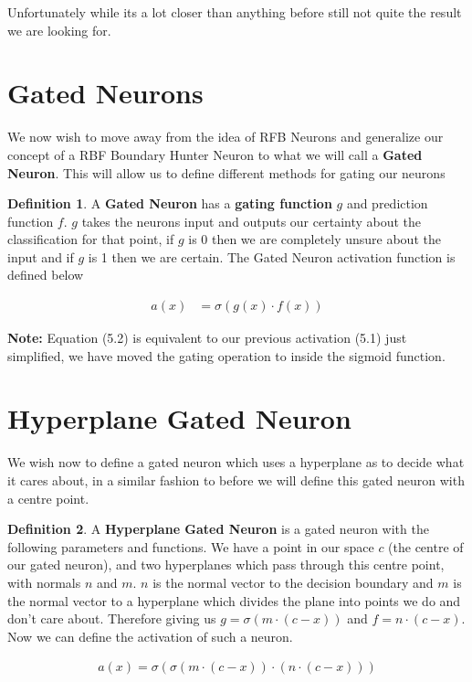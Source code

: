 \documentclass[notitlepage]{report}
\theoremstyle{definition}
\newtheorem{definition}{Definition}[section]
\begin{document}
Unfortunately while its a lot closer than anything before still not quite the result we are looking for.

\section{Gated Neurons}
We now wish to move away from the idea of RFB Neurons and generalize our concept of a RBF Boundary Hunter Neuron to what we will call a \textbf{Gated Neuron}. This will allow us to define different methods for gating our neurons

\theoremstyle{definition}
\begin{definition}
A \textbf{Gated Neuron} has a \textbf{gating function} $g$ and prediction function $f$. $g$ takes the neurons input and outputs our certainty about the classification for that point, if $g$ is 0 then we are completely unsure about the input and if $g$ is 1 then we are certain. The Gated Neuron activation function is defined below

\begin{align}
a(x) &= \sigma(g(x) \cdot f(x))
\end{align}

\textbf{Note: } Equation (5.2) is equivalent to our previous activation (5.1) just simplified, we have moved the gating operation to inside the sigmoid function.

\end{definition}

\section{Hyperplane Gated Neuron}
We wish now to define a gated neuron which uses a hyperplane as to decide what it cares about, in a similar fashion to before we will define this gated neuron with a centre point.

\theoremstyle{definition}
\begin{definition}
A \textbf{Hyperplane Gated Neuron} is a gated neuron with the following parameters and functions. We have a point in our space $c$ (the centre of our gated neuron), and two hyperplanes which pass through this centre point, with normals $n$ and $m$. $n$ is the normal vector to the decision boundary and $m$ is the normal vector to a hyperplane which divides the plane into points we do and don't care about. Therefore giving us $g = \sigma(m \cdot (c - x))$ and $f = n \cdot (c - x)$. Now we can define the activation of such a neuron.

\begin{align}
a(x) = \sigma(\sigma(m \cdot (c - x)) \cdot (n \cdot (c - x)))
\end{align}

\end{definition}
\end{document}
